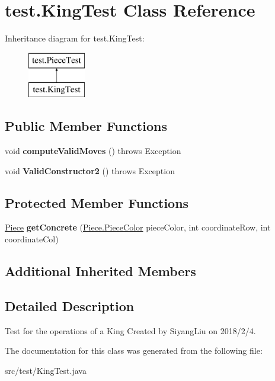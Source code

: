 \hypertarget{classtest_1_1_king_test}{}\section{test.\+King\+Test Class Reference}
\label{classtest_1_1_king_test}
Inheritance diagram for test.\+King\+Test\+:\begin{figure}[H]
\begin{center}
\leavevmode
\includegraphics[height=2.000000cm]{classtest_1_1_king_test}
\end{center}
\end{figure}
\subsection*{Public Member Functions}
\begin{DoxyCompactItemize}
\item 
\mbox{\label{classtest_1_1_king_test_a8a5a12e9551e74a53bda26babbef2c8f}} 
void {\bfseries compute\+Valid\+Moves} ()  throws Exception 
\item 
\mbox{\label{classtest_1_1_king_test_ab2ac93aaf2b3bbfafb242c03791ef729}} 
void {\bfseries Valid\+Constructor2} ()  throws Exception 
\end{DoxyCompactItemize}
\subsection*{Protected Member Functions}
\begin{DoxyCompactItemize}
\item 
\mbox{\label{classtest_1_1_king_test_af74dc8c5229cfb905ad1e81c1003ebc4}} 
\mbox{\hyperlink{classpieces_1_1_piece}{Piece}} {\bfseries get\+Concrete} (\mbox{\hyperlink{enumpieces_1_1_piece_1_1_piece_color}{Piece.\+Piece\+Color}} piece\+Color, int coordinate\+Row, int coordinate\+Col)
\end{DoxyCompactItemize}
\subsection*{Additional Inherited Members}


\subsection{Detailed Description}
Test for the operations of a King Created by Siyang\+Liu on 2018/2/4. 

The documentation for this class was generated from the following file\+:\begin{DoxyCompactItemize}
\item 
src/test/King\+Test.\+java\end{DoxyCompactItemize}
